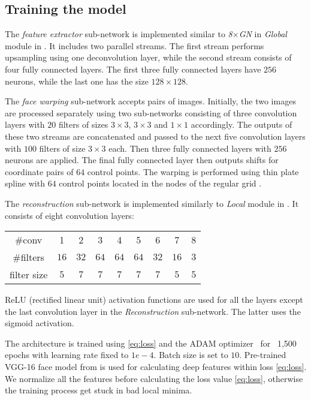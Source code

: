 \subsection{Training the model}

The \emph{feature extractor} sub-network is implemented similar to \emph{8$\times$GN} in \emph{Global} module in \cite{TuzelTH16}. It includes two parallel streams. The first stream performs upsampling using one deconvolution layer, while the second stream consists of four fully connected layers. The first three fully connected layers have $256$ neurons, while the last one has the size $128\times128$.

The \emph{face warping} sub-network accepts pairs of images. Initially, the two images are processed separately using  two sub-networks consisting of three convolution layers with $20$ filters of sizes $3\times3$, $3\times3$ and $1\times1$ accordingly. The outputs of these two streams are concatenated and passed to the next five convolution layers with $100$ filters of size $3\times3$ each.
Then three fully connected layers with $256$ neurons are applied. The final fully connected layer then outputs shifts for coordinate pairs of $64$ control points. The warping is performed using thin plate spline with $64$ control points located in the nodes of the regular grid \cite{JaderbergSZK15}.

The \emph{reconstruction} sub-network is implemented similarly to \emph{Local} module in \cite{TuzelTH16}. It consists of eight convolution layers:
\vspace{5mm}
\begin{tabular}{c |c c c c c c c c }
\hline
  \#conv & 1& 2& 3 & 4 & 5&6  & 7 &8 \\
  \#filters & $16$ & $32$&$64$&$64$&$64$&$32$&$16$&$3$  \\
  filter size &$5$& $7$& $7$& $7$& $7$& $7$& $5$& $5$ \\
\hline
\end{tabular}

ReLU (rectified linear unit) activation functions are used for all the layers except the last convolution layer in the \emph{Reconstruction} sub-network. The latter uses the sigmoid activation.

The architecture is trained using \ref{eq:loss} and the ADAM optimizer~\cite{KingmaB14} for ~1,500 epochs with learning rate fixed to $1e-4$. Batch size is set to $10$. Pre-trained VGG-16 face model from \cite{ParkhiVZ15} is used for calculating deep features within loss \ref{eq:loss}. We normalize all the features before calculating the loss value \ref{eq:loss}, otherwise the training process get stuck in bad local minima.

